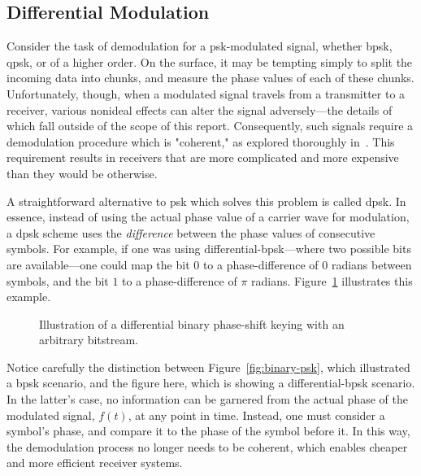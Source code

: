 \documentclass[class=report,11pt,crop=false]{standalone}
\begin{document}
\subsection{Differential Modulation}
Consider the task of demodulation for a \gls{psk}-modulated signal, whether \gls{bpsk}, \gls{qpsk}, or of a higher order. On the surface, it may be tempting simply to split the incoming data into chunks, and measure the phase values of each of these chunks. Unfortunately, though, when a modulated signal travels from a transmitter to a receiver, various nonideal effects can alter the signal adversely---the details of which fall outside of the scope of this report. Consequently, such signals require a demodulation procedure which is "coherent," as explored thoroughly in~\cite{Grami2016}. This requirement results in receivers that are more complicated and more expensive than they would be otherwise.

A straightforward alternative to \gls{psk} which solves this problem is called \gls{dpsk}. In essence, instead of using the actual phase value of a carrier wave for modulation, a \gls{dpsk} scheme uses the \emph{difference} between the phase values of consecutive symbols. For example, if one was using differential-\gls{bpsk}---where two possible bits are available---one could map the bit \(0\) to a phase-difference of \(0\) radians between symbols, and the bit \(1\) to a phase-difference of \(\pi\) radians. Figure~\ref{fig:differential-binary-psk} illustrates this example.

\begin{figure}[htbp]
    \centering
    \captionsetup{type=figure}
    \def\svgwidth{1\linewidth}
    {\scriptsize
        }
    \caption{Illustration of a differential binary phase-shift keying with an arbitrary bitstream.}
    \label{fig:differential-binary-psk}
\end{figure}

Notice carefully the distinction between Figure~\ref{fig:binary-psk}, which illustrated a \gls{bpsk} scenario, and the figure here, which is showing a differential-\gls{bpsk} scenario. In the latter's case, no information can be garnered from the actual phase of the modulated signal, \(f(t)\), at any point in time. Instead, one must consider a symbol's phase, and compare it to the phase of the symbol before it. In this way, the demodulation process no longer needs to be coherent, which enables cheaper and more efficient receiver systems.
\end{document}
